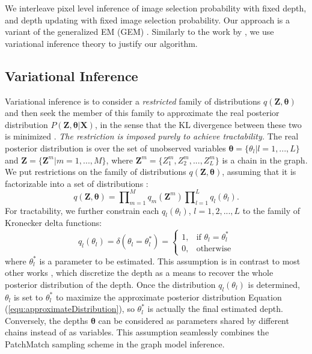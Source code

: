 We interleave pixel level inference of image selection probability with fixed depth, and depth updating with fixed image selection probability.
Our approach is a variant of the generalized EM (GEM) \cite{Neal98aview}.  Similarly to the work by  \citet{Neal98aview}, we use variational inference theory to justify our algorithm.




\subsection{Variational Inference} \label{sec:variationalInfer}
Variational inference is to consider a {\em restricted} family of distributions $q(\bm{Z}, \bm{\theta})$ and then seek the member of this family to approximate the real posterior distribution $P(\bm{Z}, \bm{\theta}|\bm{X})$, in the sense that the KL divergence between these two is minimized \cite{BishopBook}. {\em The restriction is imposed purely to achieve tractability.} The real posterior distribution is over the set of unobserved variables $\bm{\theta}=\{\theta_l| l = 1,...,L\}$ and $\bm{Z} = \{\bm{Z}^m| m = 1,...,M\}$, where $\bm{Z}^m = \{Z_1^m, Z_2^m, ..., Z_L^m\}$ is a chain in the graph. We put restrictions on the family of distributions $q(\bm{Z},\bm{\theta})$, assuming that it is factorizable into a set of distributions \cite{BishopBook}:
\begin{equation}
q(\bm{Z},\bm{\theta})  = \prod\nolimits_{m=1}^M{q_m(\bm{Z}^m)}\prod\nolimits_{l=1}^L{q_l(\theta_l)}.
\label{equ:approximateDistribution}
\end{equation}
For tractability, we further constrain each $q_l(\theta_l)$, $l = 1, 2, ... ,L$ to the family of Kronecker delta functions:
\begin{equation}
q_l(\theta_l) = \delta(\theta_l = \theta_l^*) =
\begin{cases}
    1,              & \text{if } \theta_l = \theta_l^{*} \\
    0,              & \text{otherwise}
\end{cases}
\end{equation}
where $\theta_l^{*}$ is a parameter to be estimated. This assumption is in contrast to most other works \cite{Strecha_BayesModelCVPR2004,CombinedDepthOutlier,Sun_ECCV2002_stereoBeliefProp,Sun_CVPR2005_stereo}, which discretize the depth as a means to recover the whole posterior distribution of the depth. Once the distribution $q_l(\theta_l)$ is determined, $\theta_l$ is set to $\theta_l^*$ to maximize the approximate posterior distribution Equation (\ref{equ:approximateDistribution}), so $\theta_l^*$ is actually the final estimated depth. Conversely, the depths $\bm{\theta}$ can be considered as parameters shared by different chains instead of as variables. This assumption seamlessly combines the PatchMatch sampling scheme in the graph model inference.

